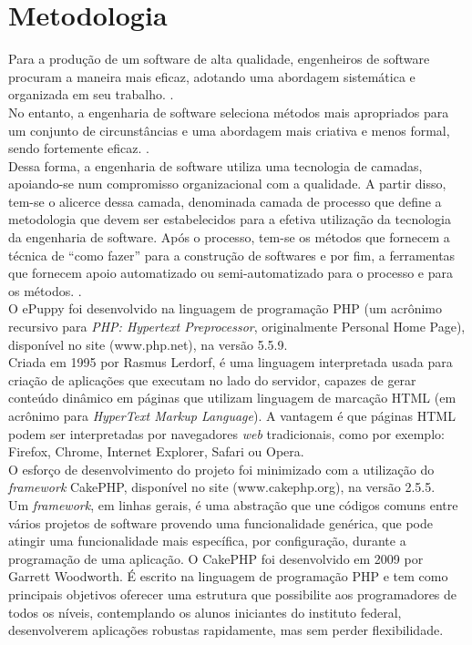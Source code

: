 \section{Metodologia}
Para a produção de um software de alta qualidade, engenheiros de software procuram a maneira mais eficaz, adotando uma abordagem sistemática e organizada em seu trabalho. \cite{Sommerville2011}.
\\
\indent
No entanto, a engenharia de software seleciona métodos mais apropriados para um conjunto de circunstâncias e uma abordagem mais criativa e menos formal, sendo fortemente eficaz. \cite{Sommerville2011}.
\\
\indent
Dessa forma, a engenharia de software utiliza uma tecnologia de camadas, apoiando-se num compromisso organizacional com a qualidade. A partir disso, tem-se o alicerce dessa camada, denominada camada de processo que define a metodologia que devem ser estabelecidos para a efetiva utilização da tecnologia da engenharia de software. Após o processo, tem-se os métodos que fornecem a técnica de “como fazer” para a construção de softwares e por fim, a ferramentas que fornecem apoio automatizado ou semi-automatizado para o processo e para os métodos. \cite{Pressman2006}.
\\
\indent
O ePuppy foi desenvolvido na linguagem de programação PHP (um acrônimo recursivo para {\it PHP: Hypertext Preprocessor}, originalmente Personal Home Page), disponível no site (www.php.net), na versão 5.5.9.
\\
\indent
Criada em 1995 por Rasmus Lerdorf, é uma linguagem interpretada usada para criação de aplicações que executam no lado do servidor, capazes de gerar conteúdo dinâmico em páginas que utilizam linguagem de marcação HTML (em acrônimo para {\it HyperText Markup Language}). A vantagem é que páginas HTML \cite{Freeman2006} podem ser interpretadas por navegadores {\it web} tradicionais, como por exemplo: Firefox, Chrome, Internet Explorer, Safari ou Opera.
\\
\indent
O esforço de desenvolvimento do projeto foi minimizado com a utilização do {\it framework} CakePHP, disponível no site (www.cakephp.org), na versão 2.5.5. 
\\
\indent
Um {\it framework}, em linhas gerais, é uma abstração que une códigos comuns entre vários projetos de software provendo uma funcionalidade genérica, que pode atingir uma funcionalidade mais específica, por configuração, durante a programação de uma aplicação. O CakePHP foi desenvolvido em 2009 por Garrett Woodworth. É escrito na linguagem de programação PHP e tem como principais objetivos oferecer uma estrutura que possibilite aos programadores de todos os níveis, contemplando os alunos iniciantes do instituto federal, desenvolverem aplicações robustas rapidamente, mas sem perder flexibilidade.
